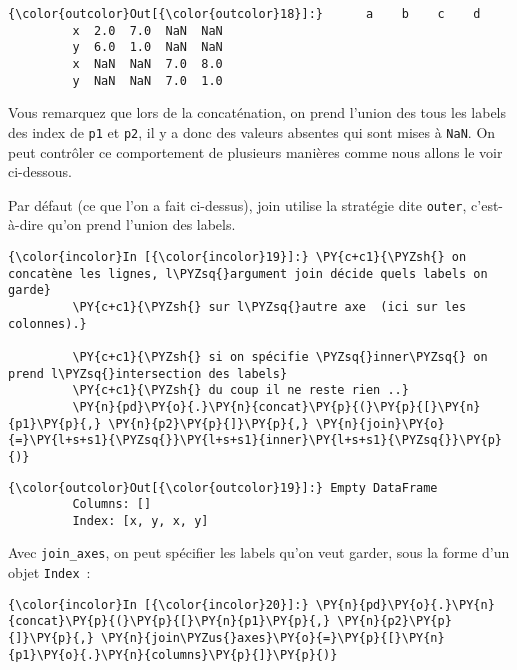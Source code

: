 \begin{Verbatim}[commandchars=\\\{\}]
{\color{outcolor}Out[{\color{outcolor}18}]:}      a    b    c    d
         x  2.0  7.0  NaN  NaN
         y  6.0  1.0  NaN  NaN
         x  NaN  NaN  7.0  8.0
         y  NaN  NaN  7.0  1.0
\end{Verbatim}
            
    Vous remarquez que lors de la concaténation, on prend l'union des tous
les labels des index de \texttt{p1} et \texttt{p2}, il y a donc des
valeurs absentes qui sont mises à \texttt{NaN}. On peut contrôler ce
comportement de plusieurs manières comme nous allons le voir ci-dessous.

    Par défaut (ce que l'on a fait ci-dessus), join utilise la stratégie
dite \texttt{outer}, c'est-à-dire qu'on prend l'union des labels.

    \begin{Verbatim}[commandchars=\\\{\}]
{\color{incolor}In [{\color{incolor}19}]:} \PY{c+c1}{\PYZsh{} on concatène les lignes, l\PYZsq{}argument join décide quels labels on garde}
         \PY{c+c1}{\PYZsh{} sur l\PYZsq{}autre axe  (ici sur les colonnes).}
         
         \PY{c+c1}{\PYZsh{} si on spécifie \PYZsq{}inner\PYZsq{} on prend l\PYZsq{}intersection des labels}
         \PY{c+c1}{\PYZsh{} du coup il ne reste rien ..}
         \PY{n}{pd}\PY{o}{.}\PY{n}{concat}\PY{p}{(}\PY{p}{[}\PY{n}{p1}\PY{p}{,} \PY{n}{p2}\PY{p}{]}\PY{p}{,} \PY{n}{join}\PY{o}{=}\PY{l+s+s1}{\PYZsq{}}\PY{l+s+s1}{inner}\PY{l+s+s1}{\PYZsq{}}\PY{p}{)}
\end{Verbatim}


\begin{Verbatim}[commandchars=\\\{\}]
{\color{outcolor}Out[{\color{outcolor}19}]:} Empty DataFrame
         Columns: []
         Index: [x, y, x, y]
\end{Verbatim}
            
    Avec \texttt{join\_axes}, on peut spécifier les labels qu'on veut
garder, sous la forme d'un objet \texttt{Index}~:

    \begin{Verbatim}[commandchars=\\\{\}]
{\color{incolor}In [{\color{incolor}20}]:} \PY{n}{pd}\PY{o}{.}\PY{n}{concat}\PY{p}{(}\PY{p}{[}\PY{n}{p1}\PY{p}{,} \PY{n}{p2}\PY{p}{]}\PY{p}{,} \PY{n}{join\PYZus{}axes}\PY{o}{=}\PY{p}{[}\PY{n}{p1}\PY{o}{.}\PY{n}{columns}\PY{p}{]}\PY{p}{)}
\end{Verbatim}


